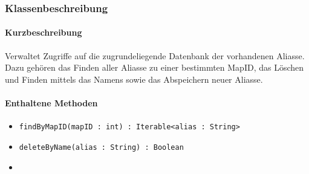 \subsubsection*{Klassenbeschreibung}%
\paragraph*{Kurzbeschreibung}
Verwaltet Zugriffe auf die zugrundeliegende Datenbank der vorhandenen Aliasse.
Dazu gehören das Finden aller Aliasse zu einer bestimmten MapID, das Löschen und Finden mittels das Namens sowie
das Abspeichern neuer Aliasse.
\paragraph*{Enthaltene Methoden}
\begin{itemize}
    \item \texttt{findByMapID(mapID : int) : Iterable<alias : String>}
    \item \texttt{deleteByName(alias : String) : Boolean}
    \item {}
\end{itemize}
